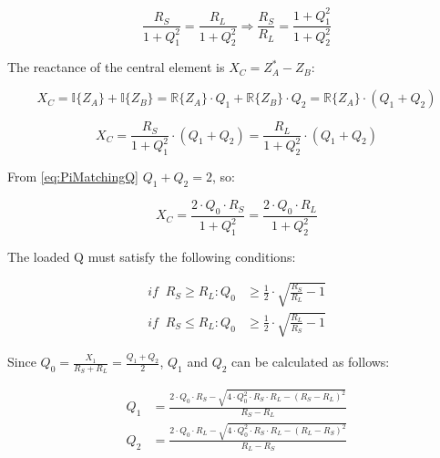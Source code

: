 \begin{equation}
\frac{R_S}{1 + Q_1^2} = \frac{R_L}{1 + Q_2^2} \Longrightarrow \frac{R_S}{R_L} = \frac{1 + Q_1^2}{1 + Q_2^2}
\end{equation}

\noindent The reactance of the central element is $X_C = Z_A^* - Z_B$:

\begin{equation}
X_C = \mathbb{I} \lbrace Z_A \rbrace + \mathbb{I} \lbrace Z_B \rbrace = \mathbb{R} \lbrace Z_A \rbrace  \cdot Q_1 + \mathbb{R} \lbrace Z_B \rbrace \cdot Q_2 = \mathbb{R} \lbrace Z_A \rbrace \cdot (Q_1 + Q_2)
\end{equation}

\begin{equation}
X_C = \frac{R_S}{1 + Q_1^2} \cdot (Q_1 + Q_2) = \frac{R_L}{1 + Q_2^2} \cdot (Q_1 + Q_2)
\end{equation}

\noindent From \ref{eq:PiMatchingQ} $Q_1 + Q_2 = 2$, so:

\begin{equation}
X_C = \frac{2 \cdot Q_0 \cdot R_S}{1 + Q_1^2} = \frac{2 \cdot Q_0 \cdot R_L}{1 + Q_2^2}
\end{equation}

\noindent The loaded Q must satisfy the following conditions:

\begin{align}
       if \;\; R_S \ge R_L:    Q_0 &\ge \frac{1}{2} \cdot \sqrt{\frac{R_S}{R_L} -1 }\\
       if \;\; R_S \le R_L:    Q_0 &\ge \frac{1}{2} \cdot \sqrt{\frac{R_L}{R_S} -1 }
\end{align}

\noindent Since $Q_0 = \frac{X_1}{R_S + R_L} = \frac{Q_1 + Q_2}{2}$, $Q_1$ and $Q_2$ can be calculated as follows:
 
\begin{align}
       Q_1 &= \frac{2 \cdot Q_0 \cdot R_S - \sqrt{4 \cdot Q_0^2 \cdot R_S \cdot R_L - (R_S - R_L)^2}}{R_S - R_L}\\
       Q_2 &= \frac{2 \cdot Q_0 \cdot R_L - \sqrt{4 \cdot Q_0^2 \cdot R_S \cdot R_L - (R_L - R_S)^2}}{R_L - R_S}
\end{align}

